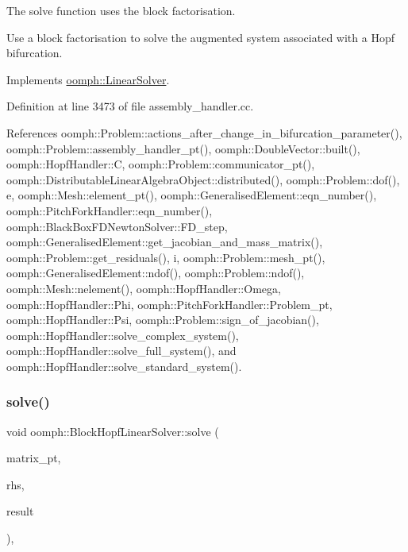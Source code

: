 The solve function uses the block factorisation. 

Use a block factorisation to solve the augmented system associated with a Hopf bifurcation. 

Implements \hyperlink{classoomph_1_1LinearSolver_a15ce22542b74ed1826ea485edacbeb6e}{oomph\+::\+Linear\+Solver}.



Definition at line 3473 of file assembly\+\_\+handler.\+cc.



References oomph\+::\+Problem\+::actions\+\_\+after\+\_\+change\+\_\+in\+\_\+bifurcation\+\_\+parameter(), oomph\+::\+Problem\+::assembly\+\_\+handler\+\_\+pt(), oomph\+::\+Double\+Vector\+::built(), oomph\+::\+Hopf\+Handler\+::C, oomph\+::\+Problem\+::communicator\+\_\+pt(), oomph\+::\+Distributable\+Linear\+Algebra\+Object\+::distributed(), oomph\+::\+Problem\+::dof(), e, oomph\+::\+Mesh\+::element\+\_\+pt(), oomph\+::\+Generalised\+Element\+::eqn\+\_\+number(), oomph\+::\+Pitch\+Fork\+Handler\+::eqn\+\_\+number(), oomph\+::\+Black\+Box\+F\+D\+Newton\+Solver\+::\+F\+D\+\_\+step, oomph\+::\+Generalised\+Element\+::get\+\_\+jacobian\+\_\+and\+\_\+mass\+\_\+matrix(), oomph\+::\+Problem\+::get\+\_\+residuals(), i, oomph\+::\+Problem\+::mesh\+\_\+pt(), oomph\+::\+Generalised\+Element\+::ndof(), oomph\+::\+Problem\+::ndof(), oomph\+::\+Mesh\+::nelement(), oomph\+::\+Hopf\+Handler\+::\+Omega, oomph\+::\+Hopf\+Handler\+::\+Phi, oomph\+::\+Pitch\+Fork\+Handler\+::\+Problem\+\_\+pt, oomph\+::\+Hopf\+Handler\+::\+Psi, oomph\+::\+Problem\+::sign\+\_\+of\+\_\+jacobian(), oomph\+::\+Hopf\+Handler\+::solve\+\_\+complex\+\_\+system(), oomph\+::\+Hopf\+Handler\+::solve\+\_\+full\+\_\+system(), and oomph\+::\+Hopf\+Handler\+::solve\+\_\+standard\+\_\+system().

\mbox{\label{classoomph_1_1BlockHopfLinearSolver_ac8f7442b3bc437f8ad25308b1c84482b}} 
\subsubsection{\texorpdfstring{solve()}{solve()}\hspace{0.1cm}{\footnotesize\ttfamily [2/3]}}
{\footnotesize\ttfamily void oomph\+::\+Block\+Hopf\+Linear\+Solver\+::solve (\begin{DoxyParamCaption}\item[{\hyperlink{classoomph_1_1DoubleMatrixBase}{Double\+Matrix\+Base} $\ast$const \&}]{matrix\+\_\+pt,  }\item[{const \hyperlink{classoomph_1_1DoubleVector}{Double\+Vector} \&}]{rhs,  }\item[{\hyperlink{classoomph_1_1DoubleVector}{Double\+Vector} \&}]{result }\end{DoxyParamCaption})\hspace{0.3cm}{\ttfamily [inline]}, {\ttfamily [virtual]}}



